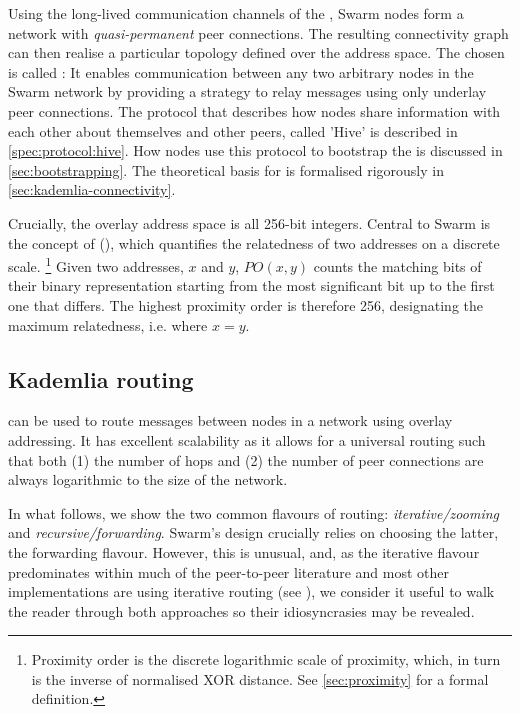 Using the long-lived communication channels of the , Swarm nodes form a network with \emph{quasi-permanent} peer connections. The resulting connectivity graph can then realise a particular topology defined over the address space. The  chosen is called : It enables communication between any two arbitrary nodes in the Swarm network by providing a strategy to relay messages using only underlay peer connections. The protocol that describes how nodes share information with each other about themselves and other peers, called 'Hive' is described in \ref{spec:protocol:hive}. How nodes use this protocol to bootstrap the  is discussed in \ref{sec:bootstrapping}. The  theoretical basis for  is formalised rigorously in \ref{sec:kademlia-connectivity}. 

Crucially, the overlay address space is all 256-bit integers. Central to Swarm is the concept of  (), which quantifies the relatedness of two addresses on a discrete scale.%
%
\footnote{Proximity order is the discrete logarithmic scale of proximity, which, in turn is the inverse of normalised XOR distance. See \ref{sec:proximity} for a formal definition.}
%
Given two addresses, $x$ and $y$, $\mathit{PO}(x,y)$ counts the matching bits of their binary representation starting from the most significant bit up to the first one that differs. The highest proximity order is therefore 256, designating the maximum relatedness, i.e. where $x=y$.

\subsection{Kademlia routing \statusgreen}\label{sec:kademlia-routing}

 can be used to route messages between nodes in a network using overlay addressing. It has excellent scalability as it allows for a universal routing such that both (1) the number of hops and (2) the number of peer connections are always logarithmic to the size of the network. 

In what follows, we show the two common flavours of routing: \emph{iterative/zooming} and \emph{recursive/forwarding}. Swarm's design crucially relies on choosing the latter, the forwarding flavour. However, this is unusual, and, as the iterative flavour predominates within much of the peer-to-peer literature and most other implementations are using iterative routing  (see \cite{maymounkov2002kademlia,baumgart2007s,lua2005survey}), we consider it useful to walk the reader through both approaches so their idiosyncrasies may be revealed.

